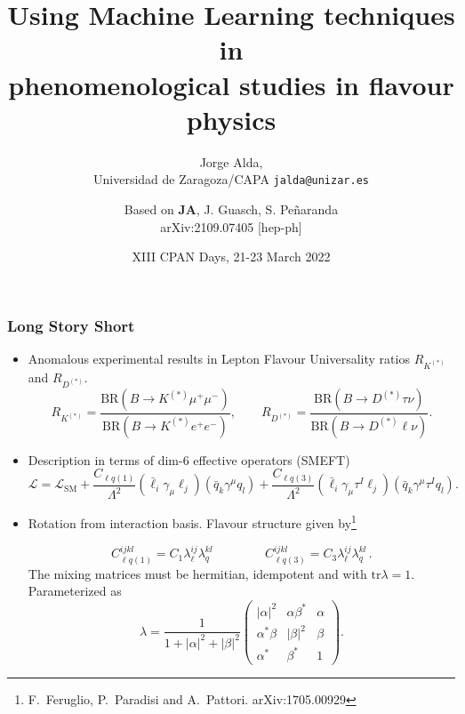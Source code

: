 \documentclass[mathserif, 10pt]{beamer}
\title[Using ML techniques in phenomenological studies in flavour physics]{Using Machine Learning techniques in\\ phenomenological studies in flavour physics}
\subtitle{Jorge Alda,\\ Universidad de Zaragoza/CAPA \hspace{4em} \texttt{jalda@unizar.es} }
\author[Jorge Alda]{Based on \textbf{JA}, J. Guasch, S. Peñaranda \\
arXiv:2109.07405 [hep-ph]}
\date[XII CPAN Days]{XIII CPAN Days, 21-23 March 2022}
\begin{document}
\begin{frame}
\titlepage
\end{frame}

\begin{frame}
\frametitle{Long Story Short}
\begin{itemize}
\item Anomalous experimental results in Lepton Flavour Universality ratios $R_{K^{(*)}}$ and $R_{D^{(*)}}$.
$$R_{K^{(*)}} = \frac{\mathrm{BR}(B\to K^{(*)}\mu^+ \mu^-)}{\mathrm{BR}(B\to K^{(*)}e^+ e^-)},\qquad R_{D^{(*)}} = \frac{\mathrm{BR}(B\to D^{(*)}\tau \nu)}{\mathrm{BR}(B\to D^{(*)}\ell \nu)}.$$
\item Description in terms of dim-6 effective operators (SMEFT)
$$\mathcal{L} = \mathcal{L}_\mathrm{SM} + \frac{C_{\ell q (1)}}{\Lambda^2}  (\bar{\ell}_i \gamma_\mu \ell_j)(\bar{q}_k \gamma^\mu  q_l)+\frac{C_{\ell q (3)}}{\Lambda^2}(\bar{\ell}_i \gamma_\mu \tau^I \ell_j)(\bar{q}_k \gamma^\mu \tau^I q_l).$$

\item Rotation from interaction basis. Flavour structure given by\footnote[1]{F.~Feruglio, P.~Paradisi and A.~Pattori. arXiv:1705.00929}

$$C_{\ell q(1)}^{ijkl} = C_1 \lambda_\ell^{ij}\lambda_q^{kl}\,\qquad\qquad C_{\ell q(3)}^{ijkl} = C_3 \lambda_\ell^{ij}\lambda_q^{kl}\,. $$
The mixing matrices must be hermitian, idempotent and with $\mathrm{tr}\lambda =1$. Parameterized as
$$ \lambda = \frac{1}{1+|\alpha|^2+|\beta|^2}\begin{pmatrix}
|\alpha|^2 & \alpha \beta^* & \alpha \\ \alpha^* \beta & |\beta|^2 & \beta \\ \alpha^* & \beta^* & 1
\end{pmatrix}. $$
\end{itemize}
\end{frame}
\end{document}
